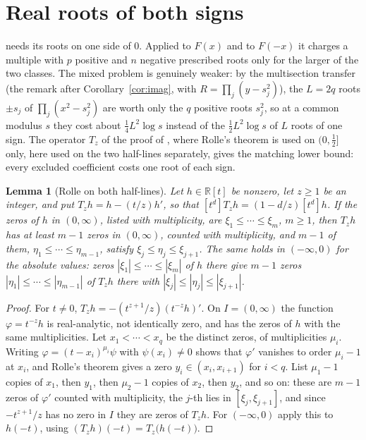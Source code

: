 \documentclass[11pt]{article}
\newtheorem{lemma}[theorem]{Lemma}
\newcommand{\R}{\mathbb R}
\begin{document}
\section{Real roots of both signs}\label{sec:bothsigns}

\cite[Theorem~3.2]{coefficient-mass} needs its roots on one side of $0$.  Applied to $F(x)$
and to $F(-x)$ it charges a multiple with $p$ positive and $n$ negative
prescribed roots only for the larger of the two classes.  The mixed problem is
genuinely weaker: by the multisection transfer (the remark after
Corollary~\ref{cor:imag}, with $R=\prod_j(y-s_j^2)$), the $L=2q$ roots $\pm s_j$
of $\prod_j(x^2-s_j^2)$ are worth only the $q$ positive roots $s_j^2$, so at a
common modulus $s$ they cost about $\frac14L^2\log s$ instead of the
$\frac12L^2\log s$ of $L$ roots of one sign.  The operator $T_z$ of the
proof of \cite[Proposition~4.2]{coefficient-mass}, where Rolle's theorem is
used on $(0,\tfrac12]$ only, here used on the two half-lines separately,
gives the matching lower bound: every excluded coefficient costs one root of
each sign.

\begin{lemma}[Rolle on both half-lines]\label{lem:rolleside}
Let $h\in\R[t]$ be nonzero, let $z\ge1$ be an integer, and put
$T_zh=h-(t/z)h'$, so that $[t^d]T_zh=(1-d/z)[t^d]h$.  If the zeros of $h$ in
$(0,\infty)$, listed with multiplicity, are $\xi_1\le\cdots\le\xi_m$, $m\ge1$, then $T_zh$ has
at least $m-1$ zeros in $(0,\infty)$, counted with multiplicity, and $m-1$ of
them, $\eta_1\le\cdots\le\eta_{m-1}$, satisfy $\xi_j\le\eta_j\le\xi_{j+1}$.
The same holds in $(-\infty,0)$ for the
absolute values: zeros $|\xi_1|\le\cdots\le|\xi_m|$ of $h$ there give
$m-1$ zeros $|\eta_1|\le\cdots\le|\eta_{m-1}|$ of $T_zh$ there with
$|\xi_j|\le|\eta_j|\le|\xi_{j+1}|$.
\end{lemma}

\begin{proof}
For $t\ne0$, $T_zh=-(t^{z+1}/z)(t^{-z}h)'$.  On $I=(0,\infty)$ the function
$\varphi=t^{-z}h$ is real-analytic, not identically zero, and has the zeros of
$h$ with the same multiplicities.  Let $x_1<\cdots<x_q$ be the distinct zeros,
of multiplicities $\mu_i$.  Writing $\varphi=(t-x_i)^{\mu_i}\psi$ with
$\psi(x_i)\ne0$ shows that $\varphi'$ vanishes to order $\mu_i-1$ at $x_i$,
and Rolle's theorem gives a zero $y_i\in(x_i,x_{i+1})$ for $i<q$.  List
$\mu_1-1$ copies of $x_1$, then $y_1$, then $\mu_2-1$ copies of $x_2$, then
$y_2$, and so on: these are $m-1$ zeros of $\varphi'$ counted with
multiplicity, the $j$-th lies in $[\xi_j,\xi_{j+1}]$, and since
$-t^{z+1}/z$ has no zero in $I$ they are zeros of $T_zh$.  For
$(-\infty,0)$ apply this to $h(-t)$, using $(T_zh)(-t)=T_z\bigl(h(-t)\bigr)$.
\end{proof}
\end{document}
